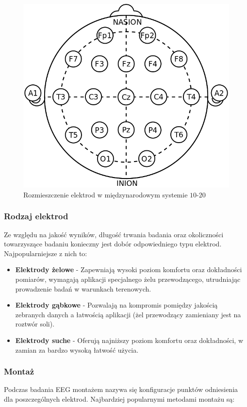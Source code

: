 \documentclass{./assets/wfis}
\begin{document}
\begin{figure}[h]
    \centering
    \includegraphics[width=0.5\columnwidth]{thesis/assets/10-20_system_electrodes.png}
    \caption{Rozmieszczenie elektrod w międzynarodowym systemie $10$-$20$}
    \label{fig:10-20-system}
\end{figure}

\subsubsection{Rodzaj elektrod}
Ze względu na jakość wyników, długość trwania badania oraz okoliczności towarzyszące badaniu konieczny jest dobór odpowiedniego typu elektrod. Najpopularniejsze z nich to:

\begin{itemize}
    \item \textbf{Elektrody żelowe} - Zapewniają wysoki poziom komfortu oraz dokładności pomiarów, wymagają aplikacji specjalnego żelu przewodzącego, utrudniając prowadzenie badań w warunkach terenowych.
    \item \textbf{Elektrody gąbkowe} - Pozwalają na kompromis pomiędzy jakością zebranych danych a łatwością aplikacji (żel przewodzący zamieniany jest na roztwór soli).
    \item \textbf{Elektrody suche} - Oferują najniższy poziom komfortu oraz dokładności, w zamian za bardzo wysoką łatwość użycia.
\end{itemize}

\subsubsection{Montaż}
Podczas badania EEG montażem nazywa się konfiguracje punktów odniesienia dla poszczególnych elektrod. Najbardziej popularnymi metodami montażu są:
\end{document}
